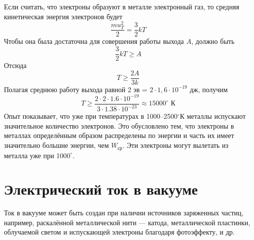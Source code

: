\documentclass[a4paper,10pt]{book}
\begin{document}
Если считать, что электроны образуют в металле электронный газ, то средняя кинетическая энергия электронов будет
\begin{equation}
\frac{mu_T^2}{2} = \frac{3}{2}kT\nonumber
\end{equation}
Чтобы она была достаточна для совершения работы выхода $A$, должно быть
\begin{equation}\label{lecture20_1}
\frac{3}{2}kT \geq A
\end{equation}
Отсюда
\begin{equation}
T \geq \frac{2A}{3k}\nonumber
\end{equation}
Полагая среднюю работу выхода равной $2 \text{ эв}$ = $2\cdot1,6 \cdot 10^{-19} \text{ дж}$, получим
\begin{equation}
T \geq \frac{2\cdot2\cdot1.6\cdot10^{-19}}{3\cdot1.38\cdot10^{-23}}\approx 15 000^{\circ}\text{ К}\nonumber
\end{equation}
Опыт показывает, что уже при температурах в 1000–2500$^{\circ}$К металлы испускают значительное количество электронов. Это обусловлено тем, что электроны в металлах определённым образом распределены по энергии и часть их имеет значительно большие энергии, чем $W_\text{ср}$. Эти электроны могут вылетать из металла уже при 100$0^{\circ}$.

\section{Электрический ток в вакууме}
Ток в вакууме может быть создан при наличии источников заряженных частиц, например, раскалённой металлической нити — катода, металлической пластинки, облучаемой светом и испускающей электроны благодаря фотоэффекту, и др.

\begin{figure}[h]
\caption{}
\label{pic42}
\end{figure}
\end{document}
